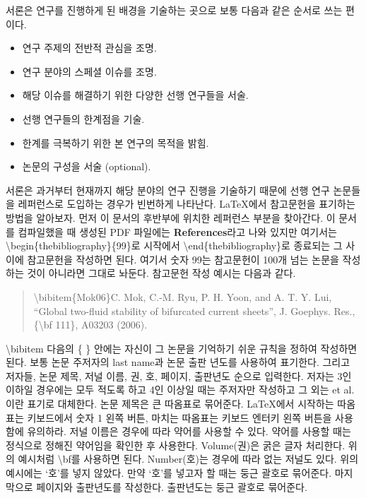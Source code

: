 \documentclass{gshs-report-v1.1}
\begin{document}
서론은 연구를 진행하게 된 배경을 기술하는 곳으로 보통 다음과 같은 순서로 쓰는 편이다.
\begin{itemize}
	\item{연구 주제의 전반적 관심을 조명.}
	\item{연구 분야의 스페셜 이슈를 조명.}
	\item{해당 이슈를 해결하기 위한 다양한 선행 연구들을 서술.}
	\item{선행 연구들의 한계점을 기술.}
	\item{한계를 극복하기 위한 본 연구의 목적을 밝힘.}
	\item{논문의 구성을 서술 (optional).}
\end{itemize}
서론은 과거부터 현재까지 해당 분야의 연구 진행을 기술하기 때문에 선행 연구 논문들을 레퍼런스로 도입하는 경우가 빈번하게 나타난다. \LaTeX 에서 참고문헌을 표기하는 방법을 알아보자. 먼저 이 문서의 후반부에 위치한 레퍼런스 부분을 찾아간다. 이 문서를 컴파일했을 때 생성된 PDF 파일에는 {\bf References}라고 나와 있지만 여기서는 {\textbackslash}begin\{thebibliography\}\{99\}로 시작에서 {\textbackslash}end\{thebibliography\}로 종료되는 그 사이에 참고문헌을 작성하면 된다. 여기서 숫자 99는 참고문헌이 100개 넘는 논문을 작성하는 것이 아니라면 그대로 놔둔다. 참고문헌 작성 예시는 다음과 같다.
\begin{quote}
	{\textbackslash}bibitem\{Mok06\}C. Mok, C.-M. Ryu, P. H. Yoon, and A. T. Y. Lui, ``Global two-fluid stability of bifurcated current sheets'', J. Goephys. Res., \{{\textbackslash}bf 111\}, A03203 (2006).
\end{quote}
{\textbackslash}bibitem 다음의 \{ \} 안에는 자신이 그 논문을 기억하기 쉬운 규칙을 정하여 작성하면 된다. 보통 논문 주저자의 last name과 논문 출판 년도를 사용하여 표기한다. 그리고 저자들, 논문 제목, 저널 이름, 권, 호, 페이지, 출판년도 순으로 입력한다. 저자는 3인 이하일 경우에는 모두 적도록 하고 4인 이상일 때는 주저자만 작성하고 그 외는 et al.이란 표기로 대체한다. 논문 제목은 큰 따옴표로 묶어준다. \LaTeX 에서 시작하는 따옴표는 키보드에서 숫자 1 왼쪽 버튼, 마치는 따옴표는 키보드 엔터키 왼쪽 버튼을 사용함에 유의하라. 저널 이름은 경우에 따라 약어를 사용할 수 있다. 약어를 사용할 때는 정식으로 정해진 약어임을 확인한 후 사용한다. Volume(권)은 굵은 글자 처리한다. 위의 예시처럼 {\textbackslash}bf를 사용하면 된다. Number(호)는 경우에 따라 없는 저널도 있다. 위의 예시에는 `호'를 넣지 않았다. 만약 `호'를 넣고자 할 때는 둥근 괄호로 묶어준다. 마지막으로 페이지와 출판년도를 작성한다. 출판년도는 둥근 괄호로 묶어준다.
\end{document}

